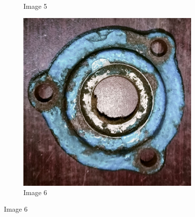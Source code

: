 \documentclass[12pt]{article}
\begin{document}
\begin{figure}[h]
\begin{subfigure}{0.3\textwidth}
        \caption{Image 5}
    \end{subfigure}
    \hfill
    \begin{subfigure}{0.3\textwidth}
        \includegraphics[width=\linewidth]{img/p_06.jpg}
        \caption{Image 6}
    \end{subfigure}
  
    \vspace{0.5cm}
  

\end{figure}
\end{document}
